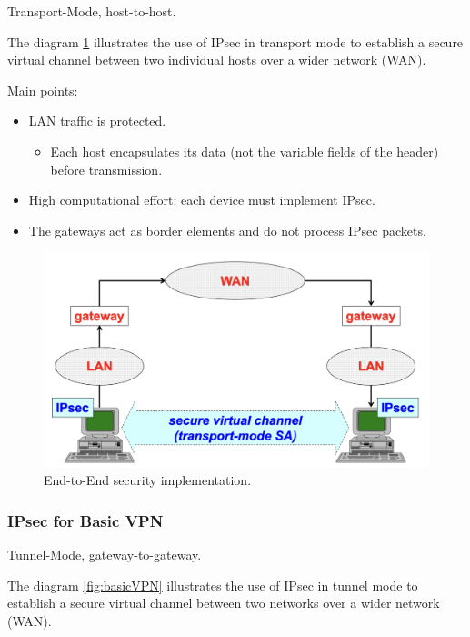 \begin{center}
    Transport-Mode, host-to-host.
\end{center}

The diagram \ref{fig:EESec} illustrates the use of IPsec in transport mode to establish a secure virtual channel between two individual hosts over a wider network (WAN).



\begin{multicols}{2}
\raggedcolumns
    Main points:
    \begin{itemize}
        \item LAN traffic is protected.
        \begin{itemize}
            \item Each host encapsulates its data (not the variable fields of the header) before transmission.
        \end{itemize}
        \item High computational effort: each device must implement IPsec.
        \item The gateways act as border elements and do not process IPsec packets.
    \end{itemize}
\columnbreak

\begin{figure}[H]
    \centering
  \includegraphics[width=\linewidth]{Images/NetSec/end_to_end_security.png}
  \caption{End-to-End security implementation.}
  \label{fig:EESec}
\end{figure}
\end{multicols}

\subsubsection{IPsec for Basic VPN}
\begin{center}
    Tunnel-Mode, gateway-to-gateway.
\end{center}
The diagram \ref{fig:basicVPN} illustrates the use of IPsec in tunnel mode to establish a secure virtual channel between two networks over a wider network (WAN).

